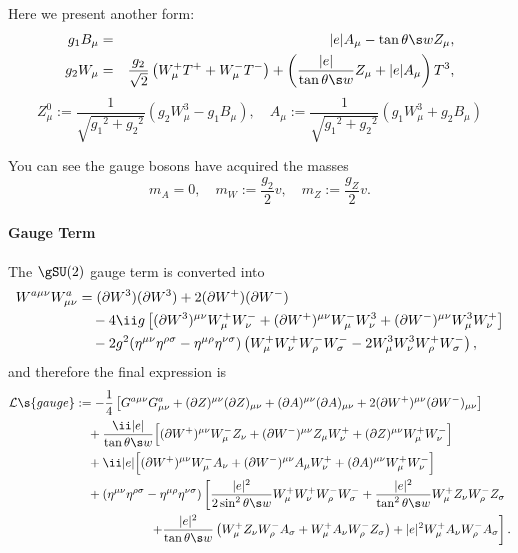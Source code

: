 \begin{rightnote}
Here we present another form:
\begin{eqnarray}
  g_1B_\mu
&=& |e| A_\mu-\tan\theta\s w Z_\mu,\\
 g_2W_\mu
&=& \frac{g_2}{\sqrt2}\left(W^+_\mu T^+ + W^-_\mu T^-\right)
   +\left(\frac{|e|}{\tan\theta\s w}Z_\mu+|e|A_\mu\right)T^3,
\end{eqnarray}
\begin{equation}
Z^0_\mu:=\frac1{\sqrt{{g_1}^2+{g_2}^2}}(g_2 W^3_\mu-g_1B_\mu),\quad
A_\mu:=\frac1{\sqrt{{g_1}^2+{g_2}^2}}(g_1 W^3_\mu+g_2B_\mu)
\end{equation}
\end{rightnote}

You can see the gauge bosons have acquired the masses
\begin{equation}
  m_A = 0, \quad m_W :=\frac{g_2}2v,\quad m_Z :=\frac{g_Z}2v.
\end{equation}


\paragraph{Gauge Term}
The $\gSU(2)$ gauge term is converted into
\begin{align*}
   W^{a\mu\nu}W^a_{\mu\nu}
&= (\partial W^3)(\partial W^3) + 2(\partial W^+)(\partial W^-)
\\&\quad
- 4\ii g\left[
     (\partial W^3)^{\mu\nu}W^+_\mu W^-_\nu
   + (\partial W^+)^{\mu\nu}W^-_\mu W^3_\nu
   + (\partial W^-)^{\mu\nu}W^3_\mu W^+_\nu
\right]
\\&\quad
 -2g^2(\Hmn\Hrs-\Hmr\Hns)
\left(
  W^+_\mu W^+_\nu W^-_\rho W^-_\sigma  - 2 W^3_\mu W^3_\nu W^+_\rho W^-_\sigma
\right),
\end{align*}
and therefore the final expression is
\begin{equation}
\begin{split}
 \Lag\s{gauge}&:=
-\frac14\left[
G^{a\mu\nu}G^a_{\mu\nu} + (\partial Z)^{\mu\nu}(\partial Z)_{\mu\nu}+(\partial A)^{\mu\nu}(\partial A)_{\mu\nu}+2(\partial W^+)^{\mu\nu}(\partial W^-)_{\mu\nu}
\right]\\&\quad
+\frac{\ii |e|}{\tan\theta\s w}\Bigl[
(\partial W^+)^{\mu\nu}W^-_\mu Z_\nu + (\partial W^-)^{\mu\nu}Z_\mu W^+_\nu +  (\partial Z)^{\mu\nu}W^+_\mu W^-_\nu
\Bigr]\\&\quad
+ \ii |e|\Bigl[
(\partial W^+)^{\mu\nu}W^-_\mu A_\nu + (\partial W^-)^{\mu\nu}A_\mu W^+_\nu +  (\partial A)^{\mu\nu}W^+_\mu W^-_\nu
\Bigr]\\&\quad
+(\Hmn\Hrs-\Hmr\Hns)\left[
\frac{|e|^2}{2\sin^2\theta\s w}W^+_\mu W^+_\nu W^-_\rho W^-_\sigma
+\frac{|e|^2}{\tan^2\theta\s w}W^+_\mu Z_\nu W^-_\rho Z_\sigma
\right.\\&\left.\qquad\qquad\qquad
+\frac{|e|^2}{\tan\theta\s w}\left(W^+_\mu Z_\nu W^-_\rho A_\sigma + W^+_\mu A_\nu W^-_\rho Z_\sigma\right)
+|e|^2W^+_\mu A_\nu W^-_\rho A_\sigma\right].
\end{split}
\end{equation}

